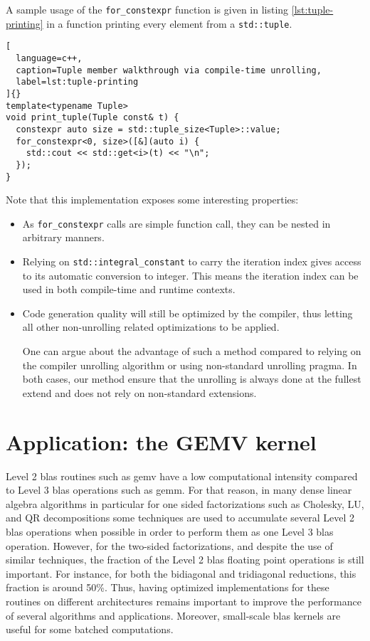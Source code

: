 \documentclass[../main]{subfiles}
\begin{document}
A sample usage of the \lstinline{for_constexpr} function is given
in listing \ref{lst:tuple-printing} in a function printing
every element from a \lstinline{std::tuple}.

\begin{lstlisting}[
  language=c++,
  caption=Tuple member walkthrough via compile-time unrolling,
  label=lst:tuple-printing
]{}
template<typename Tuple>
void print_tuple(Tuple const& t) {
  constexpr auto size = std::tuple_size<Tuple>::value;
  for_constexpr<0, size>([&](auto i) {
    std::cout << std::get<i>(t) << "\n";
  });
}
\end{lstlisting}

Note that this implementation exposes some interesting
properties:

\begin{itemize}
\item
As \lstinline{for_constexpr} calls are simple function call, they
can be nested in arbitrary manners.

\item
Relying on \lstinline{std::integral_constant} to carry the
iteration index gives access to its automatic conversion
to integer. This means the iteration index can be used in
both compile-time and runtime contexts.

\item
Code generation quality will still be optimized by the
compiler, thus letting all other non-unrolling related optimizations
to be applied.

One can argue about the advantage of such a method
compared to relying on the compiler unrolling algorithm
or using non-standard unrolling pragma. In both cases, our
method ensure that the unrolling is always done at the fullest
extend and does not rely on non-standard extensions.
\end{itemize}

\section{
  Application: the GEMV kernel
}

Level 2 \gls{blas} routines such as gemv have a low
computational intensity compared to Level 3 \gls{blas} operations
such as gemm. For that reason, in many dense linear algebra
algorithms in particular for one sided factorizations such as
Cholesky, LU, and QR decompositions some techniques are
used to accumulate several Level 2 \gls{blas} operations when
possible in order to perform them as one Level 3 \gls{blas}
operation\cite{hpcs18}. However, for the two-sided factorizations,
and despite the use of similar techniques, the fraction of the
Level 2 \gls{blas} floating point operations is still important. For
instance, for both the bidiagonal and tridiagonal reductions,
this fraction is around 50\%\cite{hpcs19}. Thus, having optimized
implementations for these routines on different architectures
remains important to improve the performance of several
algorithms and applications. Moreover, small-scale \gls{blas}
kernels are useful for some batched computations\cite{hpcs20}.
\end{document}
